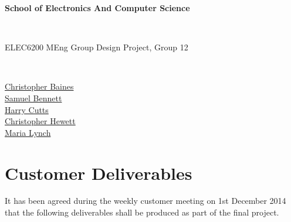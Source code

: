 \documentclass[12pt,a4paper]{article}
\begin{document}

\begin{Large}
\textbf{School of Electronics And Computer Science
}\end{Large}\\

\begin{Large}
ELEC6200 MEng Group Design Project, Group 12
\end{Large}\\

\begin{center}

{\href{mailto:cb15g11@soton.ac.uk}{Christopher Baines}}\\
{\href{mailto:sb21g11@soton.ac.uk}{Samuel Bennett}}\\
{\href{mailto:hc13g11@soton.ac.uk}{Harry Cutts}}\\
{\href{mailto:cjh1e11@soton.ac.uk}{Christopher Hewett}}\\
{\href{mailto:ml26g11@soton.ac.uk}{Maria Lynch}}

\end{center}

\tableofcontents

\section{Customer Deliverables}


It has been agreed during the weekly customer meeting on 1st December 2014 that the following deliverables shall be produced as part of the final project.
\end{document}
